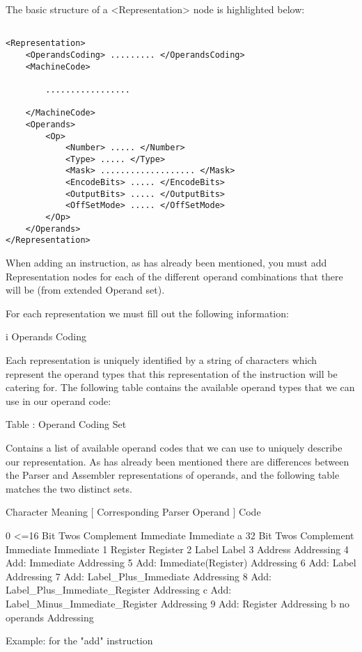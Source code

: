 \documentclass[12pt]{report}
\begin{document}
The basic structure of a <Representation> node is highlighted below:

\begin{verbatim}

<Representation>
	<OperandsCoding> ......... </OperandsCoding>
	<MachineCode>

		.................

	</MachineCode>
	<Operands>
		<Op>
			<Number> ..... </Number>
			<Type> ..... </Type>
			<Mask> ................... </Mask>
			<EncodeBits> ..... </EncodeBits>
			<OutputBits> ..... </OutputBits>
			<OffSetMode> ..... </OffSetMode>
		</Op>
	</Operands>
</Representation>

\end{verbatim}

When adding an instruction, as has already been mentioned, you must add Representation nodes for each of the different operand combinations that there will be (from extended Operand set).

For each representation we must fill out the following information:

i	Operands Coding

Each representation is uniquely identified by a string of characters which represent the operand types that this representation of the instruction will be catering for. The following table contains the available operand types that we can use in our operand code:

Table : Operand Coding Set

Contains a list of available operand codes that we can use to uniquely describe our representation. As has already been mentioned there are differences between the Parser and Assembler representations of operands, and the following table matches the two distinct sets.

Character	Meaning						[ Corresponding Parser Operand ]
Code

0 		<=16 Bit Twos Complement Immediate		Immediate
a 		32 Bit Twos Complement Immediate		Immediate
1 		Register					Register
2 		Label						Label
3 		Address						Addressing
4 		Add: Immediate					Addressing
5 		Add: Immediate(Register)			Addressing
6 		Add: Label					Addressing
7 		Add: Label_Plus_Immediate			Addressing
8 		Add: Label_Plus_Immediate_Register		Addressing
c 		Add: Label_Minus_Immediate_Register		Addressing
9 		Add: Register					Addressing
b 		no operands					Addressing

Example: for the "add" instruction
\end{document}
